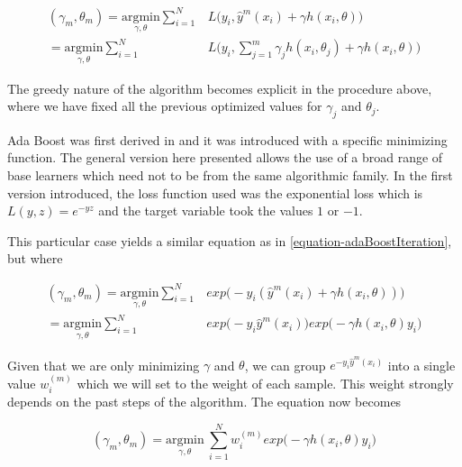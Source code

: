 \begin{equation} \label{equation-adaBoostIteration}
\begin{split}
(\gamma_{m}, \theta_{m}) = \underset{\gamma, \theta}{\mathrm{argmin}}  \sum_{i=1}^{N} & L\big( y_i,   \hat{y}^{m}(x_i) + \gamma h(x_i,\theta) \big) \\
= \underset{\gamma, \theta}{\mathrm{argmin}} \sum_{i=1}^{N}  & L\big( y_i,    \sum_{j=1}^{m} \gamma_j h(x_i,\theta_j) + \gamma h(x_i,\theta) \big)
\end{split}
\end{equation}

The greedy nature of the algorithm becomes explicit in the procedure above, where we have fixed all the previous optimized values for $\gamma_j$ and $\theta_j$.

Ada Boost was first derived in \textcite{schapire-adaBoost} and it was introduced with a specific  minimizing function. The general version here presented allows the use of a broad range of base learners which need not to be from the same algorithmic family. In the first version introduced, the loss function used was the exponential loss which is $L(y,z) = e^{-yz}$ and the target variable took the values $1$ or $-1$.

This particular case yields a similar equation as in \ref{equation-adaBoostIteration}, but where

\begin{equation} \label{equation-adaBoostExponentialIteration}
\begin{split}
(\gamma_{m}, \theta_{m}) = \underset{\gamma, \theta}{\mathrm{argmin}}  \sum_{i=1}^{N} & exp\big( -y_i  (\hat{y}^{m}(x_i) + \gamma h(x_i,\theta) )\big) \\
= \underset{\gamma, \theta}{\mathrm{argmin}}  \sum_{i=1}^{N} & exp\big( -y_i  \hat{y}^{m}(x_i)\big) exp\big(- \gamma h(x_i,\theta)y_i \big)
\end{split}
\end{equation}


Given that we are only minimizing $\gamma$ and $\theta$, we can group $e^{-y_i  \hat{y}^{m}(x_i)}$ into a single value $w_i^{(m)}$ which we will set to the weight of each sample. This weight strongly depends on the past steps of the algorithm.  The equation now becomes


\begin{equation} \label{equation-adaBoostExponentialIteration2}
(\gamma_{m}, \theta_{m}) = \underset{\gamma, \theta}{\mathrm{argmin}} \    \sum_{i=1}^{N}  w_i^{(m)} exp \big(-\gamma h(x_i,\theta)y_i \big)
\end{equation}

